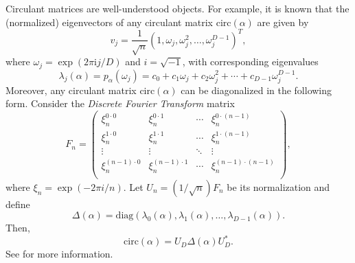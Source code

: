 Circulant matrices are well-understood objects.  For example, it is known that the (normalized) eigenvectors of any circulant matrix $\text{circ}(\alpha)$ are given by
\begin{equation}
v_j=\frac{1}{\sqrt{n}}(1,\omega_j,\omega_j^2,\ldots, \omega_j^{D-1})^T,
\end{equation}
where $\omega_j=\exp\left(2\pi \mathrm{i} j/D\right)$ and $i=\sqrt{-1}$, with corresponding eigenvalues
\begin{equation}
\lambda_j(\alpha) = p_{\alpha}(\omega_j)=c_0+c_1 \omega_j+c_2 \omega_j^2+\cdots+c_{D-1} \omega_j^{D-1}.
\end{equation}
Moreover, any circulant matrix $\text{circ}(\alpha)$ can be diagonalized in the following form.  Consider the {\it Discrete Fourier Transform} matrix
\begin{equation}
 F_n = \left(
\begin{array}{rrrr}
 \xi_n^{0\cdot 0} & \xi_n^{0\cdot 1} & \cdots &  \xi_n^{0\cdot (n-1)} \\
 \xi_n^{1\cdot 0} & \xi_n^{1\cdot 1} & \cdots &  \xi_n^{1\cdot (n-1)} \\
 \vdots & \vdots &  \ddots & \vdots \\
 \xi_n^{(n-1)\cdot 0} & \xi_n^{(n-1)\cdot 1} & \cdots  & \xi_n^{(n-1)\cdot (n-1)} \\
\end{array}
\right),
\end{equation}
where $\xi_n=\exp(-2\pi i/n)$.  Let $U_n=(1/\sqrt{n})F_n$ be its normalization and define
\begin{equation}
 \Delta(\alpha) = \text{diag}(\lambda_0(\alpha),\lambda_1(\alpha),\ldots,\lambda_{D-1}(\alpha)).
\end{equation}
Then,
\begin{equation}
\label{diagon}
 \text{circ}(\alpha) = U_D \Delta(\alpha) U_D^*.
\end{equation}
See \cite[Th.3.2.2, p. 72]{Davis} for more information.

